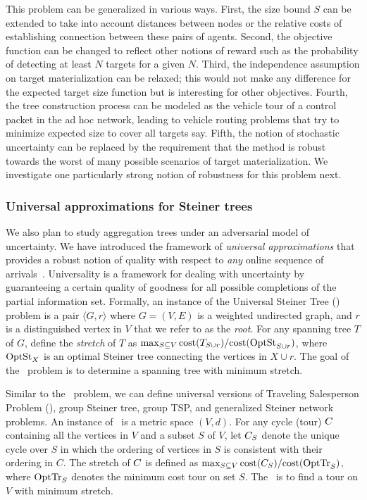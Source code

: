 This problem can be generalized in various ways. First, the size bound
$S$ can be extended to take into account distances between nodes or
the relative costs of establishing connection between these pairs of
agents. Second, the objective function can be changed to reflect other
notions of reward such as the probability of detecting at least $N$
targets for a given $N$. Third, the independence assumption on target
materialization can be relaxed; this would not make any difference for
the expected target size function but is interesting for other
objectives. Fourth, the tree construction process can be modeled as
the vehicle tour of a control packet in the ad hoc network, leading to
vehicle routing problems that try to minimize expected size to cover
all targets say. Fifth, the notion of stochastic uncertainty can be
replaced by the requirement that the method is robust towards the
worst of many possible scenarios of target materialization. We
investigate one particularly strong notion of robustness for this
problem next.

\subsubsection{Universal approximations for Steiner trees} 
We also plan to study aggregation trees under an adversarial model of
uncertainty.  We have introduced the framework of {\em universal
  approximations}\/ that provides a robust notion of quality with
respect to {\em any} online sequence of
arrivals~\cite{jia+lnrs:universal}.  Universality is a framework for
dealing with uncertainty by guaranteeing a certain quality of goodness
for all possible completions of the partial information set.
Formally, an instance of the Universal Steiner Tree (\ust) problem is
a pair $\langle G , r\rangle$ where $G = (V,E)$ is a weighted
undirected graph, and $r$ is a distinguished vertex in $V$ that we
refer to as the {\em root}.  For any spanning tree $T$ of $G$, define
the {\em stretch}\/ of $T$ as $\max_{S \subseteq V}\mbox{cost}(T_{S\cup
    r})/\mbox{cost}(\mbox{OptSt}_{S\cup r})$, where $\mbox{OptSt}_{X}$ is an optimal
Steiner tree connecting the vertices in $X \cup r$.  The goal of the
\ust\ problem is to determine a spanning tree with minimum stretch.

Similar to the \ust\ problem, we can define universal versions of
Traveling Salesperson Problem (\utsp), group Steiner tree, group TSP,
and generalized Steiner network problems.  An instance of \utsp\ is a
metric space $(V,d)$.  For any cycle (tour) $C$ containing all the
vertices in $V$ and a subset $S$ of $V$, let $C_S$ denote the unique
cycle over $S$ in which the ordering of vertices in $S$ is consistent
with their ordering in $C$.  The stretch of $C$ is defined as
$\max_{S\subseteq V} \mbox{cost}(C_{S})/\mbox{cost}(\mbox{OptTr}_{S})$, where $\mbox{OptTr}_{S}$
denotes the minimum cost tour on set $S$. The \utsp\ is to find a tour
on $V$ with minimum stretch.

